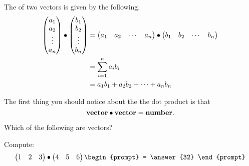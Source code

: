 \documentclass{ximera}
\begin{document}
 \begin{definition}
  The  of two vectors is given by the following.
  \begin{align*}
  \begin{pmatrix}
    a_1\\
    a_2\\
    \vdots\\
    a_n
  \end{pmatrix}
  \bullet
  \begin{pmatrix}
    b_1\\
    b_2\\
    \vdots\\
    b_n
  \end{pmatrix}
  &=\begin{pmatrix} a_1 & a_2 & \cdots & a_n\end{pmatrix}\bullet\begin{pmatrix} b_1 & b_2 & \cdots & b_n\end{pmatrix}\\
  &= \sum_{i=1}^n a_ib_i\\
  &= a_1b_1 + a_2b_2 +\dots+a_nb_n
  \end{align*}
\end{definition}

The first thing you should notice about the the dot product is that
\[
\mathbf{vector}\bullet \mathbf{vector} = \mathbf{number}.
\]


\begin{question}
  Which of the following are vectors?
  \begin{selectAll}
    \pdfOnly{\end{multicols}}
    \end{selectAll}
\end{question}


\begin{question}
  Compute:
  \[
  \begin{pmatrix}1 & 2 & 3\end{pmatrix}\dotp\begin{pmatrix}4 & 5 & 6\end{pmatrix}
  \begin{prompt}
    = \answer{32}
  \end{prompt}
  \]
\end{question}
\end{document}
